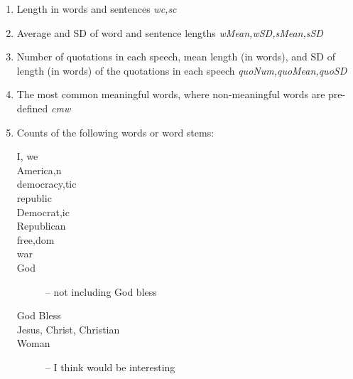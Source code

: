 \documentclass{article}
\begin{document}
\begin{enumerate}
\item
Length in words and sentences \textit{wc,sc}
\item
Average and SD of word and sentence lengths \textit{wMean,wSD,sMean,sSD}
\item
Number of quotations in each speech, mean length (in words), and SD of length (in words) of the 
quotations in each speech \textit{quoNum,quoMean,quoSD}
\item
The most common meaningful words, where non-meaningful words are pre-defined \textit{cmw}
\item
Counts of the following words or word stems: 
\scriptsize
\begin{description}
\item[I, we]
\item[America{,n}]
\item[democra{cy,tic}]
\item[republic]
\item[Democrat{,ic}]
\item[Republican]
\item[free{,dom}]
\item[war]
\item[God] -- not including God bless
\item[God Bless]
\item[{Jesus, Christ, Christian}]
\item[Woman] -- I think would be interesting
\end{description}
\end{enumerate}
\normalsize
\end{document}

